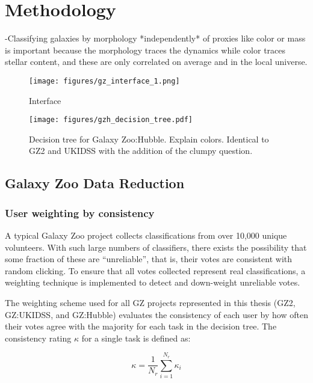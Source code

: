 \chapter{Methodology}
\label{chap:methodology}

-Classifying galaxies by morphology *independently* of proxies like color or mass is important because the morphology traces the dynamics while color traces stellar content, and these are only correlated on average and in the local universe. 




\begin{figure}
\centering
\texttt{[image: figures/gz\_interface\_1.png]}
\caption{Interface}
\end{figure}

\begin{figure}
\centering
\texttt{[image: figures/gzh\_decision\_tree.pdf]}
\caption{Decision tree for Galaxy Zoo:Hubble. Explain colors. Identical to GZ2 and UKIDSS with the addition of the clumpy question.}
\end{figure}

\section{Galaxy Zoo Data Reduction}
\subsection{User weighting by consistency}
A typical Galaxy Zoo project collects classifications from over 10,000 unique volunteers. With such large numbers of classifiers, there exists the possibility that some fraction of these are ``unreliable'', that is, their votes are consistent with random clicking. To ensure that all votes collected represent real classifications, a weighting technique is implemented to detect and down-weight unreliable votes.

The weighting scheme used for all GZ projects represented in this thesis (GZ2, GZ:UKIDSS, and GZ:Hubble) evaluates the consistency of each user by how often their votes agree with the majority for each task in the decision tree. The consistency rating $\kappa$ for a single task is defined as:

\begin{equation}
\kappa = \frac{1}{N_{r}}\sum_{i=1}^{N_{r}}{\kappa_{i}}
\label{eqn:kappa}
\end{equation}

